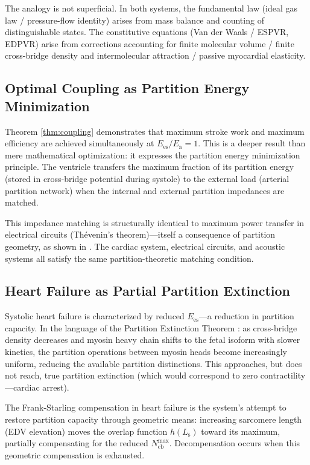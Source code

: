 \documentclass[12pt,a4paper]{article}
\theoremstyle{remark}
\newcommand{\Ees}{E_{\mathrm{es}}}
\newcommand{\Ea}{E_{\mathrm{a}}}
\newcommand{\Ncb}{N_{\mathrm{cb}}}
\newcommand{\Ls}{L_{\mathrm{s}}}
\begin{document}
The analogy is not superficial. In both systems, the fundamental law (ideal gas law / pressure-flow identity) arises from mass balance and counting of distinguishable states. The constitutive equations (Van der Waals / ESPVR, EDPVR) arise from corrections accounting for finite molecular volume / finite cross-bridge density and intermolecular attraction / passive myocardial elasticity.

\subsection{Optimal Coupling as Partition Energy Minimization}

Theorem \ref{thm:coupling} demonstrates that maximum stroke work and maximum efficiency are achieved simultaneously at $\Ees/\Ea = 1$. This is a deeper result than mere mathematical optimization: it expresses the partition energy minimization principle. The ventricle transfers the maximum fraction of its partition energy (stored in cross-bridge potential during systole) to the external load (arterial partition network) when the internal and external partition impedances are matched.

This impedance matching is structurally identical to maximum power transfer in electrical circuits (Thévenin's theorem)—itself a consequence of partition geometry, as shown in \cite{sachikonye2024transport}. The cardiac system, electrical circuits, and acoustic systems all satisfy the same partition-theoretic matching condition.

\subsection{Heart Failure as Partial Partition Extinction}

Systolic heart failure is characterized by reduced $\Ees$—a reduction in partition capacity. In the language of the Partition Extinction Theorem \cite{sachikonye2024gas}: as cross-bridge density decreases and myosin heavy chain shifts to the fetal isoform with slower kinetics, the partition operations between myosin heads become increasingly uniform, reducing the available partition distinctions. This approaches, but does not reach, true partition extinction (which would correspond to zero contractility—cardiac arrest).

The Frank-Starling compensation in heart failure is the system's attempt to restore partition capacity through geometric means: increasing sarcomere length (EDV elevation) moves the overlap function $h(\Ls)$ toward its maximum, partially compensating for the reduced $\Ncb^{\max}$. Decompensation occurs when this geometric compensation is exhausted.
\end{document}

